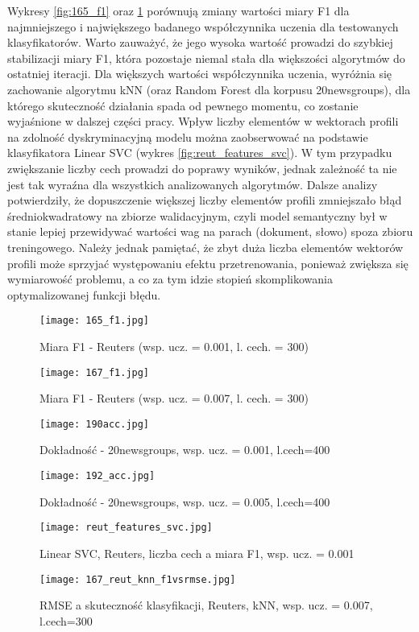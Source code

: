 \documentclass{pracamgr}
\begin{document}
Wykresy \ref{fig:165_f1} oraz \ref{fig:167_f1} porównują zmiany wartości miary F1 dla najmniejszego i największego badanego współczynnika uczenia dla testowanych klasyfikatorów. Warto zauważyć, że jego wysoka wartość prowadzi do szybkiej stabilizacji miary F1, która pozostaje niemal stała dla większości algorytmów do ostatniej iteracji. Dla większych wartości współczynnika uczenia, wyróżnia się zachowanie algorytmu kNN (oraz Random Forest dla korpusu 20newsgroups), dla którego skuteczność działania spada od pewnego momentu, co zostanie wyjaśnione w dalszej części pracy. Wpływ liczby elementów w wektorach profili na zdolność dyskryminacyjną modelu można zaobserwować na podstawie klasyfikatora Linear SVC (wykres \ref{fig:reut_features_svc}). W tym przypadku zwiększanie liczby cech prowadzi do poprawy wyników, jednak zależność ta nie jest tak wyraźna dla wszystkich analizowanych algorytmów. Dalsze analizy potwierdziły, że dopuszczenie większej liczby elementów profili zmniejszało błąd średniokwadratowy na zbiorze walidacyjnym, czyli model semantyczny był w stanie lepiej przewidywać wartości wag na parach (dokument, słowo) spoza zbioru treningowego. Należy jednak pamiętać, że zbyt duża liczba elementów wektorów profili może sprzyjać występowaniu efektu przetrenowania, ponieważ zwiększa się wymiarowość problemu, a co za tym idzie stopień skomplikowania optymalizowanej funkcji błędu.

\begin{figure}[]
  \texttt{[image: 165\_f1.jpg]}
  \caption{Miara F1 - Reuters (wsp. ucz. = 0.001, l. cech. = 300)}\label{fig:165_f1}
\endminipage\hfill
{}%
  \texttt{[image: 167\_f1.jpg]}
  \caption{Miara F1 - Reuters (wsp. ucz. = 0.007, l. cech. = 300)}\label{fig:167_f1}
\endminipage
\end{figure}

\begin{figure}[]
  \texttt{[image: 190acc.jpg]}
  \caption{Dokładność - 20newsgroups, wsp. ucz. = 0.001, l.cech=400}\label{fig:190acc}
\endminipage\hfill
{}%
  \texttt{[image: 192\_acc.jpg]}
  \caption{Dokładność - 20newsgroups, wsp. ucz. = 0.005, l.cech=400}\label{fig:192acc}
\endminipage\hfill
\end{figure}

\begin{figure}[]
%
  \texttt{[image: reut\_features\_svc.jpg]}
  \caption{Linear SVC, Reuters, liczba cech a miara F1, wsp. ucz. = 0.001}\label{fig:reut_features_svc}
\endminipage\hfill
{}
  \texttt{[image: 167\_reut\_knn\_f1vsrmse.jpg]}
  \caption{RMSE a skuteczność klasyfikacji, Reuters, kNN, wsp. ucz. = 0.007, l.cech=300}\label{fig:167_reut_knn_f1vsrmse}
\endminipage\hfill
\end{figure}
\end{document}
